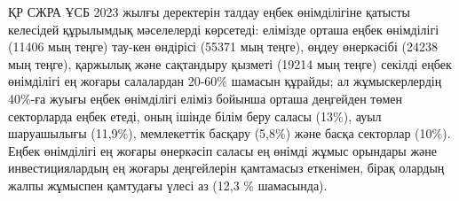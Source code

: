 {{%

ҚР СЖРА ҰСБ 2023 жылғы деректерін талдау еңбек өнімділігіне қатысты
келесідей құрылымдық мәселелерді көрсетеді: елімізде орташа еңбек
өнімділігі (11406 мың теңге) тау-кен өндірісі (55371 мың теңге), өңдеу
өнеркәсібі (24238 мың теңге), қаржылық және сақтандыру қызметі (19214
мың теңге) секілді еңбек өнімділігі ең жоғары салалардан 20-60\% шамасын
құрайды; ал жұмыскерлердің 40\%-ға жуығы еңбек өнімділігі еліміз бойынша
орташа деңгейден төмен секторларда еңбек етеді, оның ішінде білім беру
саласы (13\%), ауыл шаруашылығы (11,9\%), мемлекеттік басқару (5,8\%)
және басқа секторлар (10\%). Еңбек өнімділігі ең жоғары өнеркәсіп саласы
ең өнімді жұмыс орындары және инвестициялардың ең жоғары деңгейлерін
қамтамасыз еткенімен, бірақ олардың жалпы жұмыспен қамтудағы үлесі аз
(12,3 \% шамасында).

}}
